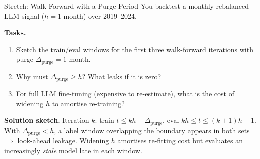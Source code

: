 \documentclass[9pt,t]{beamer}
\begin{document}
\begin{frame}[noframenumbering]{Stretch: Walk-Forward with a Purge Period}
You backtest a monthly-rebalanced LLM signal ($h = 1$ month) over 2019--2024.

\medskip
\textbf{Tasks.}
\begin{enumerate}
  \item Sketch the train/eval windows for the first three walk-forward iterations
        with purge $\Delta_{\text{purge}} = 1$ month.
  \item Why must $\Delta_{\text{purge}} \geq h$? What leaks if it is zero?
  \item For full LLM fine-tuning (expensive to re-estimate), what is the cost of
        widening $h$ to amortise re-training?
\end{enumerate}

\medskip
\textbf{Solution sketch.}
Iteration $k$: train $t \leq kh - \Delta_{\text{purge}}$, eval
$kh \leq t \leq (k{+}1)h-1$. With $\Delta_{\text{purge}} < h$, a label window
overlapping the boundary appears in both sets $\Rightarrow$ look-ahead leakage.
Widening $h$ amortises re-fitting cost but evaluates an increasingly \emph{stale}
model late in each window.
\end{frame}
\end{document}
